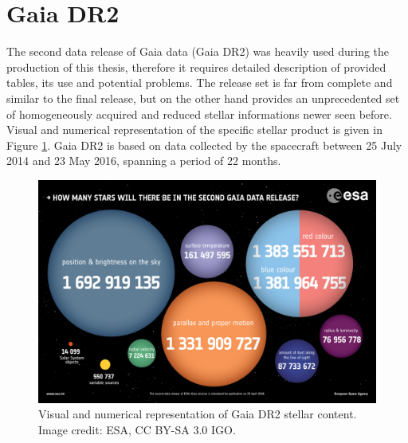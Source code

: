\section{Gaia DR2}
\label{sec:gaia_dr2_data}
The second data release of Gaia data (Gaia DR2) was heavily used during the production of this thesis, therefore it requires detailed description of provided tables, its use and potential problems. The release set is far from complete and similar to the final release, but on the other hand provides an unprecedented set of homogeneously acquired and reduced stellar informations newer seen before. Visual and numerical representation of the specific stellar product is given in Figure \ref{fig:gaia_drs}. Gaia DR2 is based on data collected by the spacecraft between 25 July 2014 and 23 May 2016, spanning a period of 22 months. 

\begin{figure}
	\centering
	\includegraphics[width=\columnwidth]{1567214817936-Gaia_DR2_numbers_1280.jpg}
	\caption{Visual and numerical representation of Gaia DR2 stellar content. Image credit: ESA, CC BY-SA 3.0 IGO.}
	\label{fig:gaia_drs}
\end{figure}

